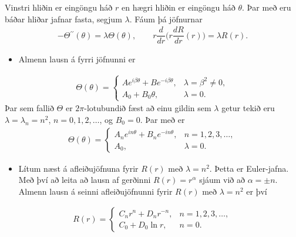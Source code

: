 \documentclass[a4paper,10pt,icelandic]{sphinxmanual}
\begin{document}
Vinstri hliðin er eingöngu háð \(r\) en hægri hliðin er eingöngu háð \(\theta\). Þar með eru báðar hliðar jafnar fasta, segjum \(\lambda\). Fáum þá jöfnurnar
\begin{equation*}
\begin{split}-\Theta{{^{\prime\prime}}}(\theta)=\lambda\Theta(\theta),
 \qquad
 r\dfrac d{dr}\bigg(r\dfrac {d R}{dr}(r)\bigg)=\lambda {R(r)}.\end{split}
\end{equation*}\begin{itemize}
\item {} 
Almenn lausn á fyrri jöfnunni er

\end{itemize}
\begin{equation*}
\begin{split}\Theta(\theta)=\begin{cases}
 Ae^{i\beta\theta}+Be^{-i\beta\theta},  &\lambda=\beta^2\neq 0,\\
 A_0+B_0\theta, &\lambda=0.
 \end{cases}\end{split}
\end{equation*}
Þar sem fallið \(\Theta\) er \(2\pi\)-lotubundið fæst
að einu gildin sem \(\lambda\) getur tekið eru
\(\lambda=\lambda_n=n^2\), \(n=0,1,2,\dots\), og \(B_0=0\).
Þar með er
\begin{equation*}
\begin{split}\Theta(\theta)=\begin{cases}
 A_ne^{in\theta}+B_ne^{-in\theta},  &n=1,2,3,\dots,\\
 A_0, &\lambda=0.
 \end{cases}\end{split}
\end{equation*}\begin{itemize}
\item {} 
Lítum næst á afleiðujöfnuna fyrir \(R(r)\) með \(\lambda=n^2\). Þetta er Euler-jafna. Með því að leita að lausn af gerðinni \(R(r)=r^\alpha\) sjáum við að \(\alpha=\pm n\). Almenn lausn á seinni afleiðujöfnunni fyrir \(R(r)\) með \(\lambda=n^2\) er því

\end{itemize}
\begin{equation*}
\begin{split}R(r)=\begin{cases}
 C_nr^n+D_nr^{-n}, &n=1,2,3,\dots,\\
 C_0+D_0\ln r, &n=0.
 \end{cases}\end{split}
\end{equation*}
\end{document}
